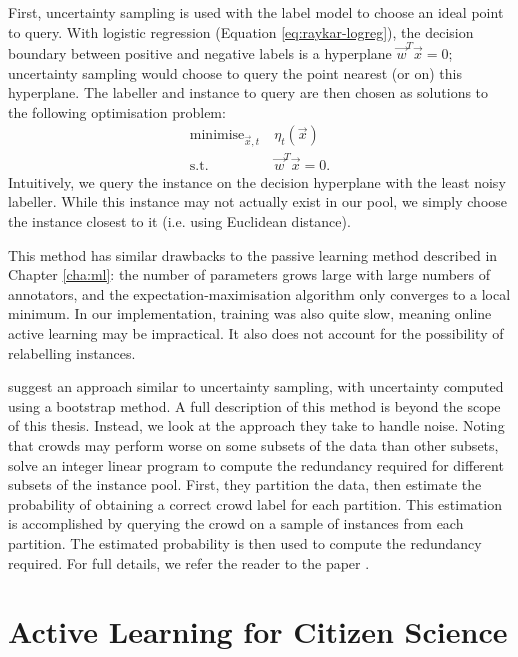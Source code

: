     First, uncertainty sampling is used with the label model to choose an ideal
    point to query. With logistic regression (Equation \ref{eq:raykar-logreg}),
    the decision boundary between positive and negative labels is a hyperplane
    $\vec w^T \vec x = 0$; uncertainty sampling would choose to query the point
    nearest (or on) this hyperplane. The labeller and instance to query are then
    chosen as solutions to the following optimisation problem:
    \begin{align*}
        \text{minimise}_{\vec x, t}\ & \eta_t(\vec x)\\
        \text{s.t. } & \vec w^T \vec x = 0.
    \end{align*}
    Intuitively, we query the instance on the decision hyperplane with the least
    noisy labeller. While this instance may not actually exist in our pool, we
    simply choose the instance closest to it (i.e. using Euclidean distance).

    This method has similar drawbacks to the \citeauthor{yan10} passive learning
    method described in Chapter \ref{cha:ml}: the number of parameters grows
    large with large numbers of annotators, and the expectation-maximisation
    algorithm only converges to a local minimum. In our implementation, training
    was also quite slow, meaning online active learning may be impractical. It
    also does not account for the possibility of relabelling instances.

    \citet{mozafari12} suggest an approach similar to uncertainty sampling, with
    uncertainty computed using a bootstrap method. A full description of this
    method is beyond the scope of this thesis. Instead, we look at the approach
    they take to handle noise. Noting that crowds may perform worse on some
    subsets of the data than other subsets, \citeauthor{mozafari12} solve an
    integer linear program to compute the redundancy required for different
    subsets of the instance pool. First, they partition the data, then estimate
    the probability of obtaining a correct crowd label for each partition. This
    estimation is accomplished by querying the crowd on a sample of instances
    from each partition. The estimated probability is then used to compute the
    redundancy required. For full details, we refer the reader to the paper
    \citep{mozafari12}.

\section{Active Learning for Citizen Science}
\label{sec:al-citizen-science}
    
